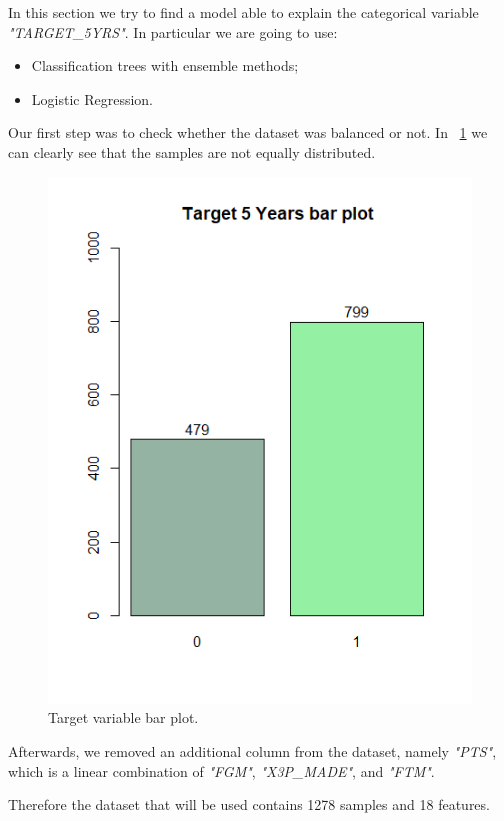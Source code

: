 In this section we try to find a model able to explain the categorical variable \textit{"TARGET\_5YRS"}.
In particular we are going to use:
\begin{itemize}
	\item Classification trees with ensemble methods;
	\item Logistic Regression.
\end{itemize}

Our first step was to check whether the dataset was balanced or not. In \Fig~\ref{fig:target_bar_plot} we can clearly see that the samples are not equally distributed. 

\begin{figure}[h]
	\centering
	\includegraphics[width=0.5\linewidth]{ImageFiles/Classification/target_bar_plot}
	\caption{Target variable bar plot.}
	\label{fig:target_bar_plot}
\end{figure}

Afterwards, we removed an additional column from the dataset, namely \textit{"PTS"}, which is a linear combination of \textit{"FGM"}, \textit{"X3P\_MADE"}, and \textit{"FTM"}.

Therefore the dataset that will be used contains 1278 samples and 18 features.
